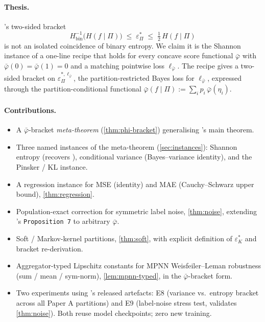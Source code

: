 \documentclass[10pt]{article}
\theoremstyle{definition}
\theoremstyle{remark}
\newcommand{\Hinv}{H_{\mathrm{bin}}^{-1}}
\newcommand{\eps}{\varepsilon}
\newcommand{\epsP}{\eps^{\!*}_{\Pi}}
\newcommand{\epsK}{\eps^{\!*}_{K}}      %
\newcommand{\epsPL}[1]{\eps^{*,#1}_{\Pi}}
\newcommand{\bphi}{\bar{\varphi}}        %
\begin{document}
\paragraph{Thesis.} 's two-sided bracket
\[
  \Hinv\!\bigl(H(f\mid\Pi)\bigr)
  \;\le\; \epsP
  \;\le\; \tfrac12\,H(f\mid\Pi)
\]
is not an isolated coincidence of binary entropy. We claim it is
the Shannon instance of a one-line recipe that holds for every
concave score functional $\bphi$ with $\bphi(0)=\bphi(1)=0$ and a
matching pointwise loss $\ell_{\bphi}$. The recipe gives a
two-sided bracket on $\epsPL{\ell_{\bphi}}$, the
partition-restricted Bayes loss for $\ell_{\bphi}$, expressed
through the partition-conditional functional
$\bphi(f\mid\Pi):=\sum_i p_i\,\bphi(\eta_i)$.

\paragraph{Contributions.}
\begin{itemize}[leftmargin=*,nosep]
  \item A $\bphi$-bracket \emph{meta-theorem}
    (\cref{thm:phi-bracket}) generalising 's
    main theorem.
  \item Three named instances of the meta-theorem
    (\cref{sec:instances}): Shannon entropy (recovers
    ), conditional variance (Bayes--variance
    identity), and the Pinsker / KL instance.
  \item A regression instance for MSE (identity) and MAE
    (Cauchy--Schwarz upper bound), \cref{thm:regression}.
  \item Population-exact correction for symmetric label noise,
    \cref{thm:noise}, extending 's
    \texttt{Proposition~7} to arbitrary $\bphi$.
  \item Soft / Markov-kernel partitions, \cref{thm:soft}, with
    explicit definition of $\epsK$ and bracket re-derivation.
  \item Aggregator-typed Lipschitz constants for MPNN
    Weisfeiler--Leman robustness (sum / mean / sym-norm),
    \cref{lem:mpnn-typed}, in the $\bphi$-bracket form.
  \item Two experiments using 's released
    artefacts: E8 (variance vs.\ entropy bracket across all Paper
    A partitions) and E9 (label-noise stress test, validates
    \cref{thm:noise}). Both reuse model checkpoints; zero new
    training.
\end{itemize}
\end{document}
